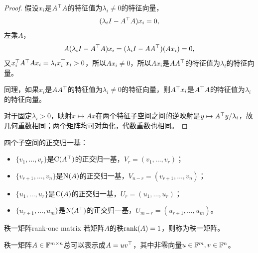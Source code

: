 \begin{proof}
	假设$x_i$是$A^\top A$的特征值为$\lambda_i \neq 0$的特征向量，
	\[
		(\lambda_iI - A^\top A)x_i = 0,
	\]
	左乘$A$，
	\[
		A(\lambda_iI - A^\top A)x_i = (\lambda_iI - AA^\top)(Ax_i) = 0,
	\]
	又$x_i^\top A^\top Ax_i = \lambda_i x_i^\top x_i > 0$，所以$Ax_i \neq 0$，所以$Ax_i$是$AA^\top$的特征值为$\lambda_i$的特征向量。
	
	同理，如果$x_i$是$AA^\top$的特征值为$\lambda_i \neq 0$的特征向量，则$A^\top x_i$是$A^\top A$的特征值为$\lambda_i$的特征向量。
	
	对于固定$\lambda_i > 0$，映射$x \mapsto Ax$在两个特征子空间之间的逆映射是$y \mapsto A^\top y/\lambda_i$，故几何重数相同；两个矩阵均可对角化，代数重数也相同。
\end{proof}

\begin{corollary}
	四个子空间的正交归一基：
	\begin{itemize}
		\item $\{v_1,\ldots,v_r\}$是$\operatorname{C}(A^\top)$的正交归一基，$V_r = (v_1,\ldots,v_r)$；
		\item $\{v_{r+1},\ldots,v_n\}$是$\operatorname{N}(A)$的正交归一基，$V_{n-r} = (v_{r+1},\ldots,v_n)$；
		\item $\{u_1,\ldots,u_r\}$是$\operatorname{C}(A)$的正交归一基，$U_r = (u_1,\ldots,u_r)$；
		\item $\{u_{r+1},\ldots,u_m\}$是$\operatorname{N}(A^\top)$的正交归一基，$U_{m-r} = (u_{r+1},\ldots,u_m)$。
	\end{itemize}
\end{corollary}

\begin{definition}
	{秩一矩阵}{rank-one matrix}
	若矩阵$A$的秩$\operatorname{rank}(A) = 1$，则称为秩一矩阵。
\end{definition}

\begin{remark}
	秩一矩阵$A \in \mathbb{F}^{m\times n}$总可以表示成$A = uv^\top$，其中非零向量$u \in \mathbb{F}^m,v \in \mathbb{F}^n$。
\end{remark}

